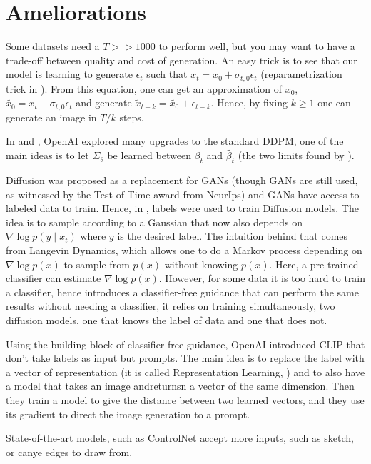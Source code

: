 \documentclass[a4paper,11pt]{article}
\begin{document}
\section{Ameliorations}

Some datasets need a $T >> 1000$ to perform well, but you may want to have a trade-off between quality and cost of generation. An easy trick is to see that our model is learning to generate $\epsilon_t$ such that $x_t = x_0 + \sigma_{t,0} \epsilon_t$ (reparametrization trick in \cite{hoDenoisingDiffusionProbabilistic2020}). From this equation, one can get an approximation of $x_0$, $\tilde{x_0} = x_t - \sigma_{t,0} \epsilon_t$ and generate $\tilde{x}_{t-k} = \tilde{x_0} + \epsilon_{t-k}$.  Hence, by fixing $k \geq 1$ one can generate an image in $T/k$ steps.

In \cite{nicholImprovedDenoisingDiffusion2021} and \cite{dhariwalDiffusionModelsBeat2021}, OpenAI explored many upgrades to the standard DDPM, one of the main ideas is to let $\Sigma_\theta$ be learned between $\beta_t$ and $\tilde{\beta_t}$ (the two limits found by \cite{hoDenoisingDiffusionProbabilistic2020}).

Diffusion was proposed as a replacement for GANs (though GANs are still used, as witnessed by the Test of Time award from NeurIps) and GANs have access to labeled data to train. Hence, in \cite{dhariwalDiffusionModelsBeat2021}, labels were used to train Diffusion models. The idea is to sample according to a Gaussian that now also depends on $\nabla \log p (y \mid x_t)$ where $y$ is the desired label. The intuition behind that comes from Langevin Dynamics, which allows one to do a Markov process depending on $\nabla \log p(x)$ to sample from $p(x)$ without knowing $p(x)$. Here, a pre-trained classifier can estimate $\nabla \log p(x)$. However, for some data it is too hard to train a classifier, hence \cite{hoClassifierFreeDiffusionGuidance2022} introduces a classifier-free guidance that can perform the same results without needing a classifier, it relies on training simultaneously, two diffusion models, one that knows the label of data and one that does not.

Using the building block of classifier-free guidance, OpenAI introduced CLIP \cite{radford2021learningtransferablevisualmodels} that don't take labels as input but prompts. The main idea is to replace the label with a vector of representation (it is called Representation Learning, \cite{bengio2014representationlearningreviewnew}) and to also have a model that takes an image andreturnsn a vector of the same dimension. Then they train a model to give the distance between two learned vectors, and they use its gradient to direct the image generation to a prompt.

State-of-the-art models, such as ControlNet \cite{zhangAddingConditionalControl2023} accept more inputs, such as sketch, or canye edges to draw from.




\printbibliography %
\end{document}
